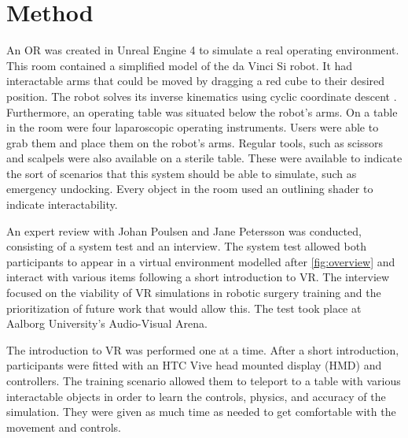 \documentclass[conference]{IEEEtran}
\begin{document}
\section{Method}
An OR was created in Unreal Engine 4 to simulate a real operating environment. This room contained a simplified model of the da Vinci Si robot. It had interactable arms that could be moved by dragging a red cube to their desired position. The robot solves its inverse kinematics using cyclic coordinate descent \citep{wang_combined_1991}. Furthermore, an operating table was situated below the robot's arms. On a table in the room were four laparoscopic operating instruments. Users were able to grab them and place them on the robot's arms. Regular tools, such as scissors and scalpels were also available on a sterile table. These were available to indicate the sort of scenarios that this system should be able to simulate, such as emergency undocking. Every object in the room used an outlining shader to indicate interactability. 

An expert review with Johan Poulsen and Jane Petersson was conducted, consisting of a system test and an interview. The system test allowed both participants to appear in a virtual environment modelled after \autoref{fig:overview} and interact with various items following a short introduction to VR. The interview focused on the viability of VR simulations in robotic surgery training and the prioritization of future work that would allow this. The test took place at Aalborg University's Audio-Visual Arena.

The introduction to VR was performed one at a time. After a short introduction, participants were fitted with an HTC Vive head mounted display (HMD) and controllers. The training scenario allowed them to teleport to a table with various interactable objects in order to learn the controls, physics, and accuracy of the simulation. They were given as much time as needed to get comfortable with the movement and controls.
\end{document}
